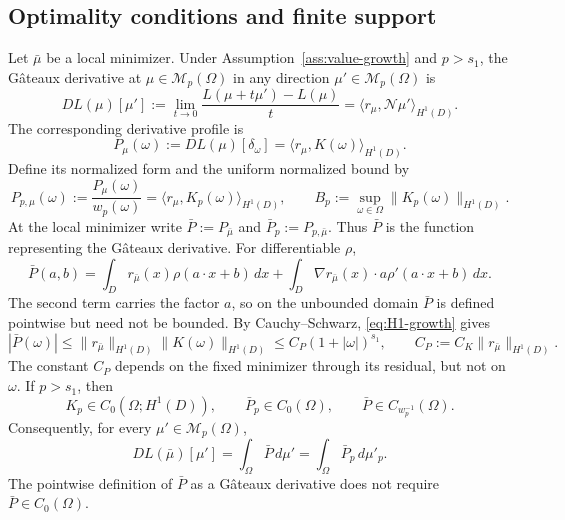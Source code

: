 \documentclass[11pt]{amsart}
\theoremstyle{definition}
\theoremstyle{remark}
\begin{document}
\subsection{Optimality conditions and finite support}
\label{sec:optimality}
Let $\bar\mu$ be a local minimizer. Under Assumption~\ref{ass:value-growth}
and $p>s_1$, the G\^ateaux derivative at $\mu\in\mathcal M_p(\Omega)$ in
any direction $\mu'\in\mathcal M_p(\Omega)$ is
\begin{equation*}
	DL(\mu)[\mu']
	:=\lim_{t\to0}\frac{L(\mu+t\mu')-L(\mu)}{t}
		=\langle r_\mu,\mathcal N\mu'\rangle_{H^1(D)}.
\end{equation*}
The corresponding derivative profile is
\begin{equation*}
	P_\mu(\omega):=DL(\mu)[\delta_\omega]
	=\langle r_\mu,K(\omega)\rangle_{H^1(D)}.
\end{equation*}
Define its normalized form and the uniform normalized bound by
\begin{equation*}
	P_{p,\mu}(\omega):=\frac{P_\mu(\omega)}{w_p(\omega)}
	=\langle r_\mu,K_p(\omega)\rangle_{H^1(D)},
	\qquad
	B_p:=\sup_{\omega\in\Omega}\|K_p(\omega)\|_{H^1(D)}.
\end{equation*}
At the local minimizer write
$\bar P:=P_{\bar\mu}$ and $\bar P_p:=P_{p,\bar\mu}$.
Thus $\bar P$ is the function representing the G\^ateaux derivative. For
differentiable $\rho$,
\begin{equation*}
	\bar{P}(a,b)
	=\int_D r_{\bar\mu}(x)\rho(a\cdot x+b)\,dx
		+\int_D\nabla r_{\bar\mu}(x)\cdot a\rho'(a\cdot x+b)\,dx.
\end{equation*}
The second term carries the factor $a$, so on the unbounded domain $\bar P$ is
defined pointwise but need not be bounded. By Cauchy--Schwarz, \eqref{eq:H1-growth} gives
\begin{equation*}
	|\bar{P}(\omega)|
	\le \|r_{\bar\mu}\|_{H^1(D)} \|K(\omega)\|_{H^1(D)}
	\le C_P (1 + |\omega|)^{s_1},
		\qquad C_P := C_K \|r_{\bar\mu}\|_{H^1(D)}.
\end{equation*}
The constant $C_P$ depends on the fixed minimizer through its residual, but not
on $\omega$.
If $p>s_1$, then
\begin{equation*}
	K_p\in C_0(\Omega;H^1(D)),
	\qquad
	\bar P_p\in C_0(\Omega),
	\qquad
	\bar P\in C_{w_p^{-1}}(\Omega).
\end{equation*}
Consequently, for every $\mu'\in\mathcal M_p(\Omega)$,
\begin{equation*}
	DL(\bar\mu)[\mu']
	=\int_\Omega\bar P\,d\mu'
	=\int_\Omega\bar P_p\,d\mu'_p.
\end{equation*}
The pointwise definition of $\bar P$ as a G\^ateaux derivative does not
require $\bar P\in C_0(\Omega)$.
\end{document}
